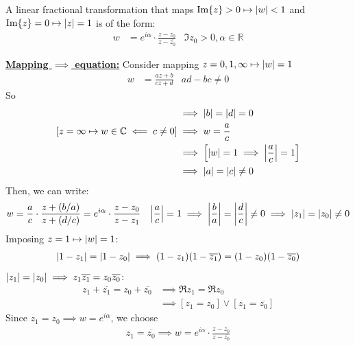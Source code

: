 \documentclass[12pt, english]{book}
\makeatletter
\renewenvironment{proof}[1][\proofname]{\par
	\pushQED{\qed}%
	\normalfont \topsep6\p@\@plus6\p@\relax
	\list{}{%
		\settowidth{\leftmargin}{\itshape\proofname:\hskip\labelsep}%
		\setlength{\labelwidth}{0pt}%
		\setlength{\itemindent}{-\leftmargin}%
		}%
	\item[\hskip\labelsep\itshape#1\@addpunct{:}]\ignorespaces
	}{\popQED\endlist\@endpefalse}
\makeatother
\begin{document}
	\begin{theorem}
		A linear fractional transformation that maps \(\Im{z}> 0 \mapsto \abs{w}<1\) and \(\Im{z} = 0 \mapsto \abs{z}=1\) is of the form:
		\begin{align*}
			w &= e^{i\alpha} \cdot \frac{z-z_0}{z-\overline{z_0}}
				& \Im{z_0} > 0, \alpha \in \mathbb{R}
		\end{align*}
	\end{theorem}
	\begin{proof}
		\textbf{\underline{Mapping \(\implies\) equation:}} \newline
		Consider mapping \(z = 0, 1, \infty \mapsto \abs{w} = 1\)
		\begin{align*}
			w &= \frac{az + b}{cz + d} & ad - bc \neq 0 
		\end{align*}
		So
		\begin{align*}
			[z = 0 \mapsto \abs{w} = 1 \implies \abs{b/d} = 0] &\implies \abs{b} = \abs{d} = 0 \\
			[z = \infty \mapsto w \in \mathbb{C} \impliedby c \neq 0] &\implies w = \frac{a}{c} \\
			&\implies \left[\abs{w} = 1 \implies \abs{\frac{a}{c}} = 1\right] \\ 
			&\implies \abs{a} = \abs{c} \neq 0
		\end{align*}
		Then, we can write:
		\begin{align*}
			w &= \frac{a}{c} \cdot \frac{z + (b/a)}{z + (d/c)} = e^{i\alpha} \cdot \frac{z-z_0}{z-z_1} &
				\abs{\frac{a}{c}} = 1 \implies \abs{\frac{b}{a}} = \abs{\frac{d}{c}} \neq 0 \implies \abs{z_1} = \abs{z_0} \neq 0
		\end{align*}
		Imposing \(z = 1 \mapsto \abs{w} = 1\):
		\begin{align*}
			\abs{1 - z_1} = \abs{1 - z_0} \implies (1 - z_1)(1 - \overline{z_1}) = (1-z_0)(1-\overline{z_0})
		\end{align*}
		\(\abs{z_1} = \abs{z_0} \implies z_1 \overline{z_1} = z_0 \overline{z_0}\):
		\begin{align*}
			z_1 + \overline{z_1} = z_0 + \overline{z_0} 
			&\implies \Re{z_1} = \Re{z_0} \\ 
			&\implies [z_1 = z_0] \lor [z_1 = \overline{z_0}]
		\end{align*}
		Since \(z_1 = z_0 \implies w = e^{i\alpha}\), we choose
		\begin{align*}
			z_1 = \overline{z_0} \implies w = e^{i\alpha} \cdot \frac{z-z_0}{z-\overline{z_0}}
		\end{align*}
		

\end{proof}
\end{document}
